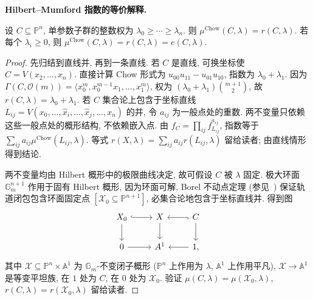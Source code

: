 \noindent\textbf{Hilbert--Mumford 指数的等价解释.}
\begin{theorem}\label{src:6.8.11}
设 $C\subseteq\mathbb P^n$, 单参数子群的整数权为 $\lambda_0\geq\cdots\geq\lambda_n$. 则 $\mu^{\mathrm{Chow}}(C,\allowbreak \lambda)=r(C,\allowbreak \lambda)$. 若每个 $\lambda_i\geq0$, 则 $\mu^{\mathrm{Chow}}(C,\allowbreak \lambda)=r(C,\allowbreak \lambda)=e(C,\allowbreak \lambda)$.
\end{theorem}
\begin{proof}
先归结到直线并, 再到一条直线. 若 $C$ 是直线, 可换坐标使 $C=V(x_2,\allowbreak \ldots,\allowbreak x_n)$. 直接计算 Chow 形式为 $u_{00}u_{11}-u_{01}u_{10}$, 指数为 $\lambda_0+\lambda_1$. 因为 $\Gamma(C,\allowbreak \mathcal O(m))=\langle x_0^m,\allowbreak x_0^{m-1}x_1,\allowbreak \ldots,\allowbreak x_1^m\rangle$, 权为 $(\lambda_0+\lambda_1)\binom{m+1}{2}$, 故 $r(C,\allowbreak \lambda)=\lambda_0+\lambda_1$. 若 $C$ 集合论上包含于坐标直线 $L_{ij}=V(x_0,\allowbreak \ldots,\allowbreak \widehat x_i,\allowbreak \ldots,\allowbreak \widehat x_j,\allowbreak \ldots,\allowbreak x_n)$ 的并, 令 $a_{ij}$ 为一般点处的重数. 两不变量只依赖这些一般点处的概形结构, 不依赖嵌入点. 由 $f_C=\prod_{ij}f_{L_{ij}}^{a_{ij}}$, 指数等于 $\sum_{ij}a_{ij}\mu^{\mathrm{Chow}}(L_{ij},\allowbreak \lambda)$. 等式 $r(X,\allowbreak \lambda)=\sum_{ij}a_{ij}r(L_{ij},\allowbreak \lambda)$ 留给读者; 由直线情形得到结论.

两不变量均由 Hilbert 概形中的极限曲线决定, 故可假设 $C$ 被 $\lambda$ 固定. 极大环面 $\mathbb G_m^{n+1}$ 作用于固有 Hilbert 概形, 因为环面可解, Borel 不动点定理 (参见~\cite[推论 17.3]{Mil17}) 保证轨道闭包包含环面固定点 $[\mathcal X_0\subseteq\mathbb P^{n+1}]$, 必集合论地包含于坐标直线并. 得到图
\[
\begin{tikzcd}
\mathcal X_0\arrow[r,hook]\arrow[d]&\mathcal X\arrow[d]&C\arrow[l,hook]\arrow[d]\\
0\arrow[r]&\mathbb A^1&1\arrow[l],
\end{tikzcd}
\]
其中 $\mathcal X\subseteq\mathbb P^n\times\mathbb A^1$ 为 $\mathbb G_m$-不变闭子概形 ($\mathbb P^n$ 上作用为 $\lambda$, $\mathbb A^1$ 上作用平凡), $\mathcal X\to\mathbb A^1$ 是等变平坦族, 在 $1$ 处为 $C$, 在 $0$ 处为 $\mathcal X_0$. 验证 $\mu(C,\allowbreak \lambda)=\mu(\mathcal X_0,\allowbreak \lambda)$, $r(C,\allowbreak \lambda)=r(\mathcal X_0,\allowbreak \lambda)$ 留给读者.


\end{proof}
